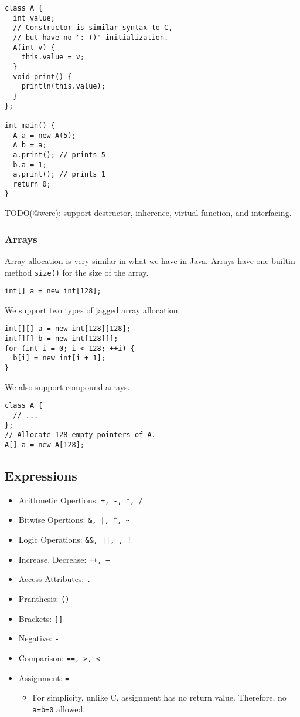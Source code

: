\documentclass{article}
\begin{document}
\begin{lstlisting}[caption=Class definition\label{code:class}]
class A {
  int value;
  // Constructor is similar syntax to C,
  // but have no ": ()" initialization.
  A(int v) {
    this.value = v;
  }
  void print() {
    println(this.value);
  }
};

int main() {
  A a = new A(5);
  A b = a;
  a.print(); // prints 5
  b.a = 1;
  a.print(); // prints 1
  return 0;
}
\end{lstlisting}

TODO(@were): support destructor, inherence, virtual function, and interfacing.

\subsubsection{Arrays}

Array allocation is very similar in what we have in Java.
Arrays have one builtin method \texttt{size()} for the size of the array.

\begin{lstlisting}[caption=1-D Array Allocation]
int[] a = new int[128];
\end{lstlisting}

We support two types of jagged array allocation.
\begin{lstlisting}[caption=1-D Array Allocation]
int[][] a = new int[128][128];
int[][] b = new int[128][];
for (int i = 0; i < 128; ++i) {
  b[i] = new int[i + 1];
}
\end{lstlisting}

We also support compound arrays.
\begin{lstlisting}[caption=1-D Array Allocation]
class A {
  // ...
};
// Allocate 128 empty pointers of A.
A[] a = new A[128];
\end{lstlisting}

\subsection{Expressions}

\begin{itemize}
  \item Arithmetic Opertions: \texttt{+, -, *, /}
  \item Bitwise Opertions: \verb|&, |\texttt{|, }\verb|^, ~|
  \item Logic Operations: \verb|&&, |\texttt{||, }\verb|, !|
  \item Increase, Decrease: \texttt{++, --}
  \item Access Attributes: \texttt{.}
  \item Pranthesis: \texttt{()}
  \item Brackets: \texttt{[]}
  \item Negative: \texttt{-}
  \item Comparison: \verb|==, >, <|
  \item Assignment: \texttt{=}
    \begin{itemize}
      \item For simplicity, unlike C, assignment has no return value.
	Therefore, no \texttt{a=b=0} allowed.
    \end{itemize}
\end{itemize}
\end{document}
